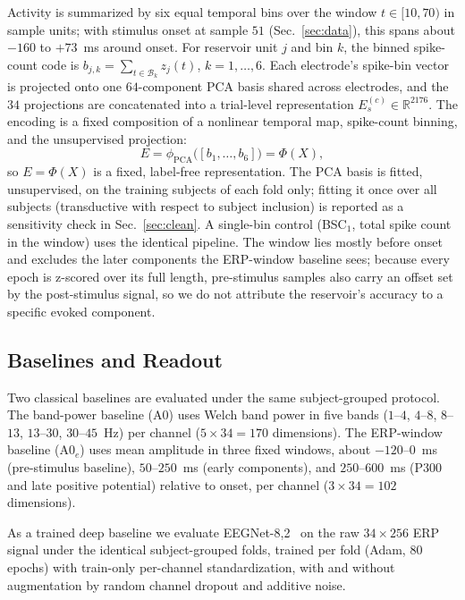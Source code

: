 \documentclass[conference]{IEEEtran}
\newcommand{\R}{\mathbb{R}}
\begin{document}
Activity is summarized by six equal temporal bins over the window $t\in[10,70)$ in sample units; with stimulus onset at sample $51$ (Sec.~\ref{sec:data}), this spans about $-160$ to $+73$~ms around onset. For reservoir unit $j$ and bin $k$, the binned spike-count code is $b_{j,k}=\sum_{t\in\mathcal{B}_k} z_j(t)$, $k=1,\ldots,6$. Each electrode's spike-bin vector is projected onto one $64$-component PCA basis shared across electrodes, and the $34$ projections are concatenated into a trial-level representation $E_s^{(c)}\in\R^{2176}$. The encoding is a fixed composition of a nonlinear temporal map, spike-count binning, and the unsupervised projection:
\begin{equation}\label{eq:operator}
E=\phi_{\mathrm{PCA}}\!\big([b_1,\dots,b_6]\big)=\Phi(X),
\end{equation}
so $E=\Phi(X)$ is a fixed, label-free representation. The PCA basis is fitted, unsupervised, on the training subjects of each fold only; fitting it once over all subjects (transductive with respect to subject inclusion) is reported as a sensitivity check in Sec.~\ref{sec:clean}. A single-bin control (BSC$_1$, total spike count in the window) uses the identical pipeline. The window lies mostly before onset and excludes the later components the ERP-window baseline sees; because every epoch is z-scored over its full length, pre-stimulus samples also carry an offset set by the post-stimulus signal, so we do not attribute the reservoir's accuracy to a specific evoked component.




\subsection{Baselines and Readout}
Two classical baselines are evaluated under the same subject-grouped protocol. The band-power baseline (A0) uses Welch band power in five bands ($1$--$4$, $4$--$8$, $8$--$13$, $13$--$30$, $30$--$45$~Hz) per channel ($5\times34=170$ dimensions). The ERP-window baseline (A0$_e$) uses mean amplitude in three fixed windows, about $-120$--$0$~ms (pre-stimulus baseline), $50$--$250$~ms (early components), and $250$--$600$~ms (P300 and late positive potential) relative to onset, per channel ($3 \times 34 = 102$ dimensions).

As a trained deep baseline we evaluate EEGNet-8,2~\cite{lawhern2018eegnet} on the raw $34\times256$ ERP signal under the identical subject-grouped folds, trained per fold (Adam, $80$ epochs) with train-only per-channel standardization, with and without augmentation by random channel dropout and additive noise.
\end{document}
